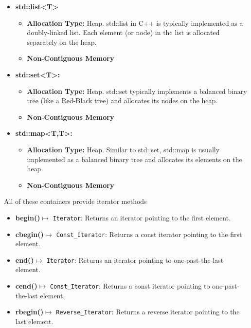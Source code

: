 \documentclass{report}
\begin{document}
\begin{concept}
\begin{itemize}
\begin{itemize}
        \end{itemize}
        \item \textbf{std::list<T>}
        \begin{itemize}
            \item \textbf{Allocation Type:} Heap. std::list in C++ is typically implemented as a doubly-linked list. Each element (or node) in the list is allocated separately on the heap. 
            \item \textbf{Non-Contiguous Memory}
        \end{itemize}
        \item \textbf{std::set<T>:}
        \begin{itemize}
            \item \textbf{Allocation Type:} Heap. std::set typically implements a balanced binary tree (like a Red-Black tree) and allocates its nodes on the heap.
            \item \textbf{Non-Contiguous Memory}
        \end{itemize}
        \item \textbf{std::map<T,T>:}
        \begin{itemize}
            \item \textbf{Allocation Type:} Heap. Similar to std::set, std::map is usually implemented as a balanced binary tree and allocates its elements on the heap.
            \item \textbf{Non-Contiguous Memory}
        \end{itemize}
    \end{itemize}
    \bigbreak \noindent 
    \begin{notebox}
       All of these containers provide iterator methods 
       \begin{itemize}
           \item \textbf{begin()}\(\mapsto\) \texttt{Iterator}: Returns an iterator pointing to the first element.
            \item \textbf{cbegin()}\(\mapsto\) \texttt{Const\_Iterator}: Returns a const iterator pointing to the first element.
            \item \textbf{end()}\(\mapsto\) \texttt{Iterator}: Returns an iterator pointing to one-past-the-last element.
            \item \textbf{cend()}\(\mapsto\) \texttt{Const\_Iterator}: Returns a const iterator pointing to one-past-the-last element.
            \item \textbf{rbegin()}\(\mapsto\) \texttt{Reverse\_Iterator}: Returns a reverse iterator pointing to the last element.

\end{itemize}
\end{notebox}
\end{concept}
\end{document}

